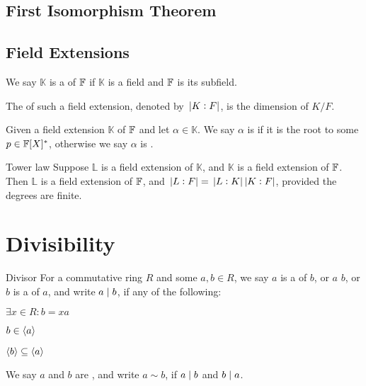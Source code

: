 \documentclass{styles/tufte}
\begin{document}
\subsection{First Isomorphism Theorem}


\subsection{Field Extensions}

  \begin{definition}{}{}
    We say $\mathbb{K}$ is a  of $\mathbb{F}$ if $\mathbb{K}$ is a field and $\mathbb{F}$ is its subfield.
    
    The  of such a field extension, denoted by $\abs{K:F}$, is the dimension of $K/F$.
  \end{definition}
  
  \begin{definition}{}{}
    Given a field extension $\mathbb{K}$ of $\mathbb{F}$ and let $\alpha \in \mathbb{K}$. We say $\alpha$ is  if it is the root to some $p \in \mathbb{F}[X]^*$, otherwise we say $\alpha$ is .
  \end{definition}
  
  \begin{theorem}{Tower law}{}
    Suppose $\mathbb{L}$ is a field extension of $\mathbb{K}$, and $\mathbb{K}$ is a field extension of $\mathbb{F}$. Then $\mathbb{L}$ is a field extension of $\mathbb{F}$, and $\abs{L:F} = \abs{L:K} \abs{K:F}$, provided the degrees are finite.
  \end{theorem}



\section{Divisibility}

\begin{definition}{Divisor}{}
  For a commutative ring $R$ and some $a, b \in R$, we say $a$ is a  of $b$, or $a$  $b$, or $b$ is a  of $a$, and write $a \mid b$, if any of the following:
  \begin{romanenum}
    \item $\exists x \in R: b = xa$
    \item $b \in \langle a \rangle$
    \item $\langle b \rangle \subseteq \langle a \rangle$
  \end{romanenum}
  
  We say $a$ and $b$ are , and write $a \sim b$, if $a \mid b$ and $b \mid a$.
\end{definition}
\end{document}
